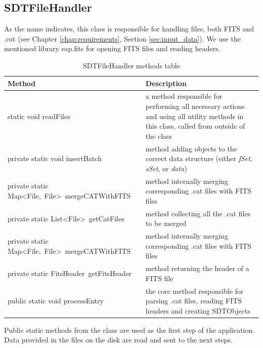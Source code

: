 \newpage

\subsection{SDTFileHandler}\label{sec:file_handler}

	As the name indicates, this class is responsible for handling files, both FITS and .cat (see Chapter \ref{chap:requirements}, Section \ref{sec:input_data}). We use the mentioned library eap.fits for opening FITS files and reading headers.
	
\begin{table}[H]
\centering
\setlength{\extrarowheight}{2pt}
\begin{tabularx}{\textwidth}{|X|X|}
\hline
\textbf{Method} & \textbf{Description} \\ \hline
static void \mbox{readFiles} & a method responsible for performing all necessary actions and using all utility methods in this class, called from outside of the class \\ \hline
private static void \mbox{insertBatch} & method adding objects to the correct data structure (either \emph{fSet}, \emph{sSet}, or \emph{data}) \\ \hline
private static \mbox{Map<File, File> mergeCATWithFITS} & method internally merging corresponding .cat files with FITS files \\ \hline
private static \mbox{List<File> getCatFiles} & method collecting all the .cat files to be merged \\ \hline
private static \mbox{Map<File, File> mergeCATWithFITS} & method internally merging corresponding .cat files with FITS files \\ \hline
private static \mbox{FitsHeader getFitsHeader} & method returning the header of a FITS file \\ \hline
public static void \mbox{processEntry} & the core method responsible for parsing .cat files, reading FITS headers and creating SDTObjects \\ \hline
\end{tabularx}
\caption{SDTFileHandler methods table}
\label{tab:class_methods_FH}
\end{table}

	Public static methods from the class are used as the first step of the application. Data provided in the files on the disk are read and sent to the next steps.
